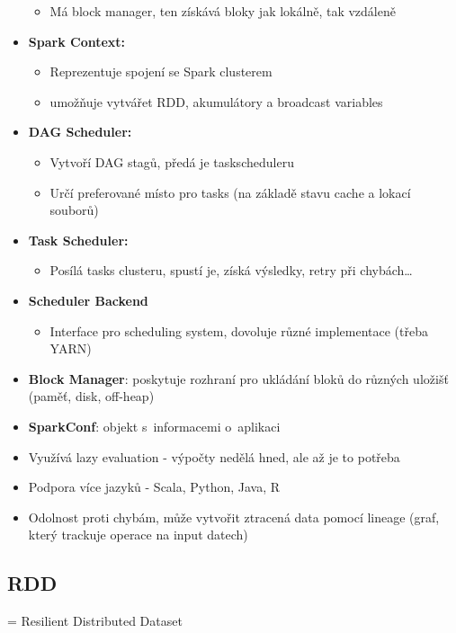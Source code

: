 \begin{itemize}
    \begin{itemize}
        \item Má block manager, ten získává bloky jak lokálně, tak vzdáleně
    \end{itemize}
    \item \textbf{Spark Context:}
    \begin{itemize}
        \item Reprezentuje spojení se Spark clusterem
        \item umožňuje vytvářet RDD, akumulátory a broadcast variables
    \end{itemize}
    \item \textbf{DAG Scheduler:}
    \begin{itemize}
        \item Vytvoří DAG stagů, předá je taskscheduleru
        \item Určí preferované místo pro tasks (na základě stavu cache a lokací souborů)
    \end{itemize}
    \item \textbf{Task Scheduler:}
    \begin{itemize}
        \item Posílá tasks clusteru, spustí je, získá výsledky, retry při chybách\dots
    \end{itemize}
    \item \textbf{Scheduler Backend}
    \begin{itemize}
        \item Interface pro scheduling system, dovoluje různé implementace (třeba YARN)
    \end{itemize}
    \item \textbf{Block Manager}: poskytuje rozhraní pro ukládání bloků do různých uložišť (paměť, disk, off-heap)
    \item \textbf{SparkConf}: objekt s~informacemi o~aplikaci
    \item Využívá lazy evaluation - výpočty nedělá hned, ale až je to potřeba
    \item Podpora více jazyků - Scala, Python, Java, R
    \item Odolnost proti chybám, může vytvořit ztracená data pomocí lineage (graf, který trackuje operace na input datech)
\end{itemize}

\subsection{RDD}
= Resilient Distributed Dataset

